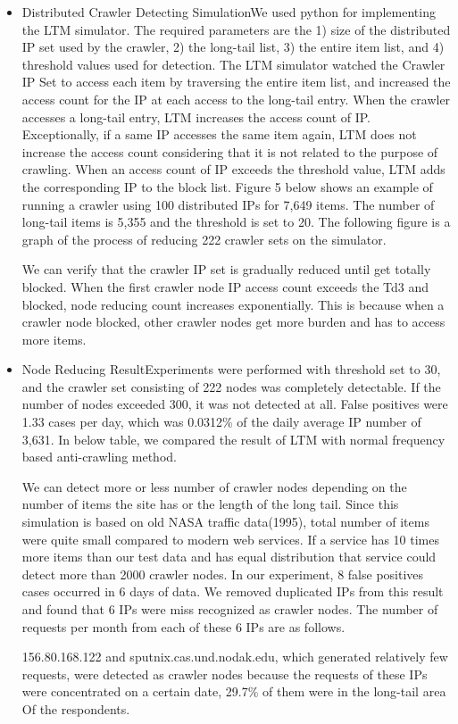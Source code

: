 \documentclass[sigconf,anonymous=true]{acmart}
\begin{document}
\begin{itemize}
\item Distributed Crawler Detecting Simulation\newline We used python for implementing the LTM simulator. The required parameters are the 1) size of the distributed IP set used by the crawler, 2) the long-tail list, 3) the entire item list, and 4) threshold values used for detection.
The LTM simulator watched the Crawler IP Set to access each item by traversing the entire item list, and increased the access count for the IP at each access to the long-tail entry.
When the crawler accesses a long-tail entry, LTM increases the access count of IP. Exceptionally, if a same IP accesses the same item again, LTM does not increase the access count considering that it is not related to the purpose of crawling. When an access count of IP exceeds the threshold value, LTM adds the corresponding IP to the block list. Figure 5 below shows an example of running a crawler using 100 distributed IPs for 7,649 items. The number of long-tail items is 5,355 and the threshold is set to 20. The following figure is a graph of the process of reducing 222 crawler sets on the simulator. 

We can verify that the crawler IP set is gradually reduced until get totally blocked. When the first crawler node IP access count exceeds the Td3 and blocked, node reducing count increases exponentially. This is because when a crawler node blocked, other crawler nodes get more burden and has to access more items.\newline

\item Node Reducing Result\newline Experiments were performed with threshold set to 30, and the crawler set consisting of 222 nodes was completely detectable. If the number of nodes exceeded 300, it was not detected at all. False positives were 1.33 cases per day, which was 0.0312\% of the daily average IP number of 3,631. In below table, we compared the result of LTM with normal frequency based anti-crawling method.

We can detect more or less number of crawler nodes depending on the number of items the site has or the length of the long tail. Since this simulation is based on old NASA traffic data(1995), total number of items were quite small compared to modern web services. If a service has 10 times more items than our test data and has equal distribution that service could detect more than 2000 crawler nodes.
In our experiment, 8 false positives cases occurred in 6 days of data. We removed duplicated IPs from this result and found that 6 IPs were miss recognized as crawler nodes. The number of requests per month from each of these 6 IPs are as follows. 

156.80.168.122 and sputnix.cas.und.nodak.edu, which generated relatively few requests, were detected as crawler nodes because the requests of these IPs were concentrated on a certain date, 29.7\% of them were in the long-tail area Of the respondents.
\end{itemize}
\end{document}
